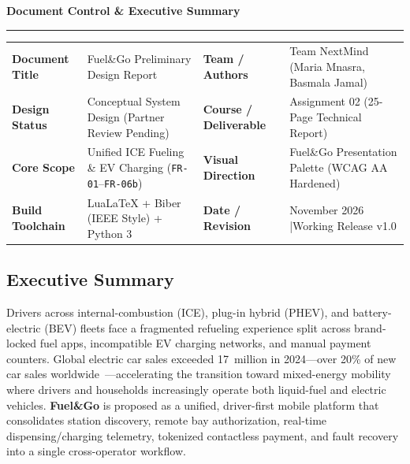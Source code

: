 {\headingfont\Large\bfseries\color{fgEspresso} Document Control \& Executive Summary}\par
\vspace{-2pt}\noindent\textcolor{fgAmber}{\rule{\linewidth}{1.1pt}}
\vspace{4pt}

\noindent
{\footnotesize
\begin{tabularx}{\linewidth}{@{}P{32mm} L P{30mm} L@{}}
  \toprule
   &  &  &  \\
  \midrule
  \textbf{Document Title} & Fuel\&Go Preliminary Design Report & \textbf{Team / Authors} & Team NextMind (Maria Mnasra, Basmala Jamal) \\
  \textbf{Design Status} & Conceptual System Design (Partner Review Pending) & \textbf{Course / Deliverable} & Assignment 02 (25-Page Technical Report) \\
  \textbf{Core Scope} & Unified ICE Fueling \& EV Charging (\texttt{FR-01}--\texttt{FR-06b}) & \textbf{Visual Direction} & Fuel\&Go Presentation Palette (WCAG AA Hardened) \\
  \textbf{Build Toolchain} & LuaLaTeX + Biber (IEEE Style) + Python 3 & \textbf{Date / Revision} & November 2026 \quad|\quad Working Release v1.0 \\
  \bottomrule
\end{tabularx}
}

\vspace{3pt}

\subsection*{Executive Summary}
\vspace{-2pt}
Drivers across internal-combustion (ICE), plug-in hybrid (PHEV), and battery-electric (BEV) fleets face a fragmented refueling experience split across brand-locked fuel apps, incompatible EV charging networks, and manual payment counters. Global electric car sales exceeded 17~million in 2024---over 20\% of new car sales worldwide~\cite{iea2025gev}---accelerating the transition toward mixed-energy mobility where drivers and households increasingly operate both liquid-fuel and electric vehicles. \textbf{Fuel\&Go} is proposed as a unified, driver-first mobile platform that consolidates station discovery, remote bay authorization, real-time dispensing/charging telemetry, tokenized contactless payment, and fault recovery into a single cross-operator workflow.

